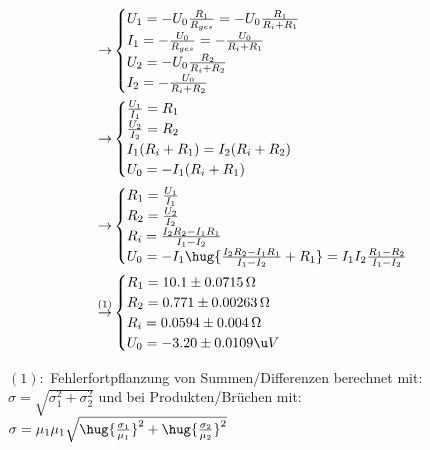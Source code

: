 \documentclass[11pt, german]{article}
\begin{document}
\subsection{}
\begin{align*}
    \rightarrow&\begin{cases}
        U_1 = -U_0 \frac{R_1}{R_{ges}} = -U_0 \frac{R_1}{R_i + R_1}\\
        I_1 = -\frac{U_0}{R_{ges}} = -\frac{U_0}{R_i + R_1}\\
        U_2 = -U_0 \frac{R_2}{R_i + R_2}\\
        I_2 = -\frac{U_0}{R_i + R_2}\\
    \end{cases}\\
    \rightarrow&\begin{cases}
        \frac{U_1}{I_1} = R_1\\
        \frac{U_2}{I_2} = R_2\\
        I_1(R_i + R_1) = I_2(R_i + R_2)\\
        U_0 = -I_1 (R_i + R_1)\\
    \end{cases}\\
    \rightarrow&\begin{cases}
        R_1 = \frac{U_1}{I_1}  \\
        R_2 = \frac{U_2}{I_2} \\
        R_i  = \frac{I_2 R_2 - I_1 R_   1}{I_1-I_2}\\
        U_0 = -I_1 \hug{\frac{I_2 R_2 - I_1 R_1}{I_1-I_2} + R_1}
        =  I_1 I_2 \frac{R_1 - R_2}{I_1-I_2}
    \end{cases}\\
    \overset{(1)}{\rightarrow}&\begin{cases}
        R_1  = 10.1 \pm 0.0715\, \Omega \\
        R_2  = 0.771 \pm 0.00263\, \Omega\\
        R_i  = 0.0594 \pm 0.004\, \Omega \\
        U_0 =  -3.20 \pm 0.0109 \u V
    \end{cases}
\end{align*}
\begin{adjustwidth}{20pt}{}
    $(1):$ Fehlerfortpflanzung von Summen/Differenzen berechnet mit: 
    $\sigma = \sqrt{\sigma_1^2+\sigma_2^2}$
    und bei Produkten/Brüchen mit:
    $\sigma = \mu_1\mu_1\sqrt{\hug{\frac{\sigma_1}{\mu_1}}^2 + \hug{\frac{\sigma_2}{\mu_2}}^2}$
\end{adjustwidth}
\end{document}
